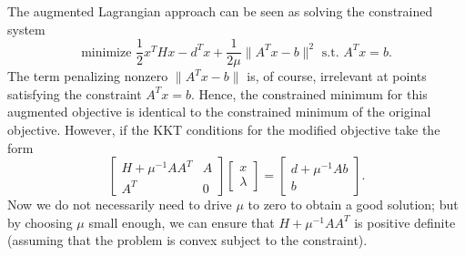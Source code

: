 \documentclass[12pt, leqno]{article} %
\begin{document}
The augmented Lagrangian approach can be seen as solving the
constrained system
\[
  \mbox{minimize } \frac{1}{2} x^T H x - d^T x + \frac{1}{2\mu} \|A^T x-b\|^2
  \mbox{ s.t. } A^T x = b.
\]
The term penalizing nonzero $\|A^T x-b\|$ is, of course, irrelevant at
points satisfying the constraint $A^T x = b$.  Hence, the constrained
minimum for this augmented objective is identical to the constrained
minimum of the original objective.  However, if the KKT conditions for
the modified objective take the form
\[
  \begin{bmatrix}
    H+\mu^{-1}AA^T & A \\
    A^T & 0
  \end{bmatrix}
  \begin{bmatrix} x \\ \lambda \end{bmatrix} =
  \begin{bmatrix} d + \mu^{-1} A b \\ b \end{bmatrix}.
\]
Now we do not necessarily need to drive $\mu$ to zero to obtain a good
solution; but by choosing $\mu$ small enough, we can ensure that
$H + \mu^{-1} AA^T$ is positive definite (assuming that the problem is
convex subject to the constraint).
\end{document}
